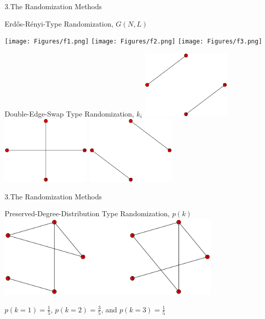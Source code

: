 \documentclass{beamer}
\begin{document}
\begin{frame}{3.The Randomization Methods}

\footnotesize{Erd\H{o}s-R\'{e}nyi-Type Randomization, $G(N,L)$} 

	\texttt{[image: Figures/f1.png]}  
	\texttt{[image: Figures/f2.png]} 
    \texttt{[image: Figures/f3.png]}
    
\footnotesize{Double-Edge-Swap Type Randomization, $k_i$}
	\includegraphics[width=0.32\textwidth]{Figures/G1_swap.eps}  
    \includegraphics[width=0.32\textwidth]{Figures/G2_swap.eps}  
	\includegraphics[width=0.32\textwidth]{Figures/G3_swap.eps} 

\end{frame}



\begin{frame}{3.The Randomization Methods}

\footnotesize{Preserved-Degree-Distribution Type Randomization, $p(k)$} 
	\centering	
	\includegraphics[width=0.8\textwidth]{Figures/G_degree_dist_1.eps}  

 $p(k=1)=\frac{1}{5}$, $p(k=2)=\frac{3}{5}$, and $p(k=3)=\frac{1}{5}$ 

\end{frame}
\end{document}
